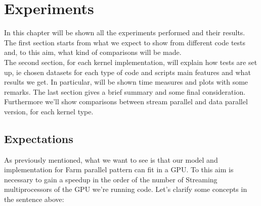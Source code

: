 \chapter{Experiments}
\label{chap:experim}
In this chapter will be shown all the experiments performed and their results. The first section starts from what we expect to show from different code tests and, to this aim, what kind of comparisons will be made.\\
The second section, for each kernel implementation, will explain how tests are set up, ie chosen datasets for each type of code and scripts main features and what results we get. In particular, will be shown time measures and plots with some remarks.
The last section gives a brief summary and some final consideration. Furthermore we'll show comparisons between stream parallel and data parallel version, for each kernel type.

\section{Expectations}
As previously mentioned, what we want to see is that our model and implementation for Farm parallel pattern can fit in a GPU.
To this aim is necessary to gain a speedup in the order of the number of Streaming multiprocessors of the GPU we're running code.
Let's clarify some concepts in the sentence above:

